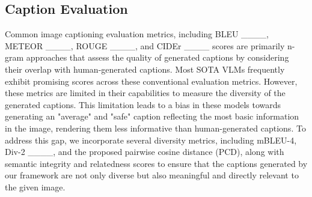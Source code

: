 \subsection{Caption Evaluation}\label{rw:eval}
Common image captioning evaluation metrics, including BLEU ____, METEOR ____, ROUGE ____, and CIDEr ____ scores are primarily n-gram approaches that assess the quality of generated captions by considering their overlap with human-generated captions. Most SOTA VLMs frequently exhibit promising scores across these conventional evaluation metrics. However, these metrics are limited in their capabilities to measure the diversity of the generated captions. This limitation leads to a bias in these models towards generating an "average" and "safe" caption reflecting the most basic information in the image, rendering them less informative than human-generated captions. To address this gap, we incorporate several diversity metrics, including mBLEU-4, Div-2 ____, and the proposed pairwise cosine distance (PCD), along with semantic integrity and relatedness scores to ensure that the captions generated by our framework are not only diverse but also meaningful and directly relevant to the given image.